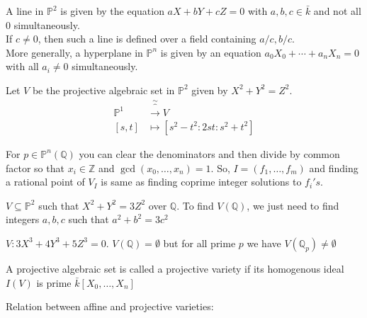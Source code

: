 \documentclass[oneside, 12pt, ]{scrbook}
\newcommand{\QQ}{\mathbb Q}
\newcommand{\ZZ}{\mathbb Z}
\theoremstyle{theorem}
\begin{document}
\begin{example}
A line in $\mathbb{P}^2$ is given by the equation $aX + bY + cZ=0$ with $a,b,c \in \bar{k}$ and not all $0$ simultaneously. \\
If $c\neq 0$, then such a line is defined over a field containing $a/c, b/c$. \\
More generally, a hyperplane in $\mathbb{P}^n$ is given by an equation $a_{0}X_{0} + \cdots + a_{n}X_{n} = 0$ with all $a_{i} \neq 0$ simultaneously.
\end{example}

\begin{example}
Let $V$ be the projective algebraic set in $\mathbb{P}^2$ given by $X^2 + Y^2 = Z^2$. 
\begin{align*}
\mathbb{P}^1 & \overbrace{\rightarrow}^{\sim} V \\
[s,t] & \mapsto [s^2 - t^2 : 2st : s^2+t^2]
\end{align*}
\end{example}

\begin{remark}
For $p \in \mathbb{P}^n(\QQ)$ you can clear the denominators and then divide by common factor so that $x_{i} \in \ZZ$ and $\gcd(x_{0} , \hdots ,x_{n})=1$. So, $I =(f_{1}, \hdots , f_{m})$ and finding a rational point of $V_{I}$ is same as finding coprime integer solutions to $f_{i}'s$. 
\end{remark}

\begin{example}
$V \subseteq \mathbb{P}^2$ such that $X^2 + Y^2 = 3Z^2$ over $\QQ$. To find $V(\QQ)$, we just need to find integers $a,b,c$ such that $a^2 +b^2 = 3c^2$
\end{example}

\begin{example}
$V : 3X^3 + 4Y^3 + 5Z^3 = 0$. $V(\QQ) = \emptyset$ but for all prime $p$ we have $V(\QQ_{p}) \neq \emptyset$
\end{example}

\begin{definition}
A projective algebraic set is called a projective variety if its homogenous ideal $I(V)$ is prime $\bar{k}[X_{0}, \hdots , X_{n}]$
\end{definition}

Relation between affine and projective varieties: \\
\end{document}
